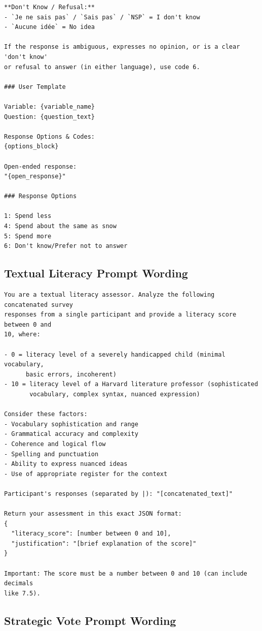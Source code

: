 {\begin{verbatim}
**Don't Know / Refusal:**
- `Je ne sais pas` / `Sais pas` / `NSP` = I don't know
- `Aucune idée` = No idea

If the response is ambiguous, expresses no opinion, or is a clear 'don't know' 
or refusal to answer (in either language), use code 6.

### User Template

Variable: {variable_name}
Question: {question_text}

Response Options & Codes:
{options_block}

Open-ended response:
"{open_response}"

### Response Options

1: Spend less
4: Spend about the same as snow
5: Spend more
6: Don't know/Prefer not to answer
\end{verbatim}
}

\clearpage

\subsection{Textual Literacy Prompt Wording}
\label{appendix-literacy-prompt}

{\small
\begin{verbatim}
You are a textual literacy assessor. Analyze the following concatenated survey 
responses from a single participant and provide a literacy score between 0 and 
10, where:

- 0 = literacy level of a severely handicapped child (minimal vocabulary, 
      basic errors, incoherent)
- 10 = literacy level of a Harvard literature professor (sophisticated 
       vocabulary, complex syntax, nuanced expression)

Consider these factors:
- Vocabulary sophistication and range
- Grammatical accuracy and complexity
- Coherence and logical flow
- Spelling and punctuation
- Ability to express nuanced ideas
- Use of appropriate register for the context

Participant's responses (separated by |): "[concatenated_text]"

Return your assessment in this exact JSON format:
{
  "literacy_score": [number between 0 and 10],
  "justification": "[brief explanation of the score]"
}

Important: The score must be a number between 0 and 10 (can include decimals 
like 7.5).
\end{verbatim}
}

\clearpage

\subsection{Strategic Vote Prompt Wording}
\label{appendix-strategic-prompt}

